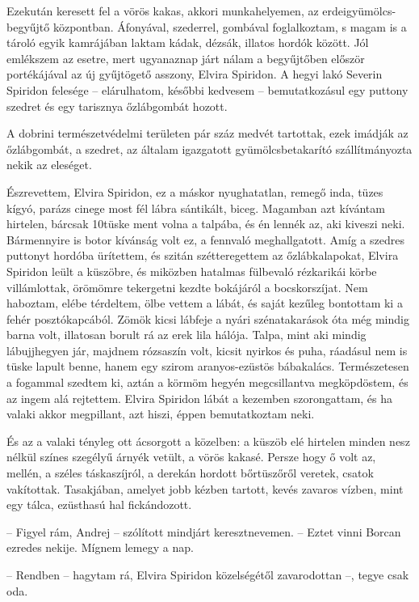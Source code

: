 \documentclass{IEEEtran}
\begin{document}
Ezekután keresett fel a vörös kakas, akkori munkahelyemen, az
erdeigyümölcs-begyűjtő központban. Áfonyával, szederrel, gombával
foglalkoztam, s magam is a tároló egyik kamrájában laktam kádak, dézsák,
illatos hordók között. Jól emlékszem az esetre, mert ugyanaznap járt nálam a
begyűjtőben először portékájával az új gyűjtögető asszony, Elvira Spiridon. A
hegyi lakó Severin Spiridon felesége – elárulhatom, későbbi kedvesem –
bemutatkozásul egy puttony szedret és egy tarisznya őzlábgombát hozott.

A dobrini természetvédelmi területen pár száz medvét tartottak, ezek imádják
az őzlábgombát, a szedret, az általam igazgatott gyümölcsbetakarító
szállítmányozta nekik az eleséget.

Észrevettem, Elvira Spiridon, ez a máskor nyughatatlan, remegő inda, tüzes
kígyó, parázs cinege most fél lábra sántikált, biceg. Magamban azt kívántam
hirtelen, bárcsak 10tüske ment volna a talpába, és én lennék az, aki kiveszi
neki. Bármennyire is botor kívánság volt ez, a fennvaló meghallgatott. Amíg a
szedres puttonyt hordóba ürítettem, és szitán szétteregettem az
őzlábkalapokat, Elvira Spiridon leült a küszöbre, és miközben hatalmas
fülbevaló rézkarikái körbe villámlottak, örömömre tekergetni kezdte bokájáról
a bocskorszíjat. Nem haboztam, elébe térdeltem, ölbe vettem a lábát, és saját
kezűleg bontottam ki a fehér posztókapcából. Zömök kicsi lábfeje a nyári
szénatakarások óta még mindig barna volt, illatosan borult rá az erek lila
hálója. Talpa, mint aki mindig lábujjhegyen jár, majdnem rózsaszín volt,
kicsit nyirkos és puha, ráadásul nem is tüske lapult benne, hanem egy szirom
aranyos-ezüstös bábakalács. Természetesen a fogammal szedtem ki, aztán a
körmöm hegyén megcsillantva megköpdöstem, és az ingem alá rejtettem. Elvira
Spiridon lábát a kezemben szorongattam, és ha valaki akkor megpillant, azt
hiszi, éppen bemutatkoztam neki.

És az a valaki tényleg ott ácsorgott a közelben: a küszöb elé hirtelen minden
nesz nélkül színes szegélyű árnyék vetült, a vörös kakasé. Persze hogy ő volt
az, mellén, a széles táskaszíjról, a derekán hordott bőrtüszőről veretek,
csatok vakítottak. Tasakjában, amelyet jobb kézben tartott, kevés zavaros
vízben, mint egy tálca, ezüsthasú hal fickándozott.

– Figyel rám, Andrej – szólított mindjárt keresztnevemen. – Eztet vinni Borcan
ezredes nekije. Mígnem lemegy a nap.

– Rendben – hagytam rá, Elvira Spiridon közelségétől zavarodottan –, tegye
csak oda.
\end{document}
